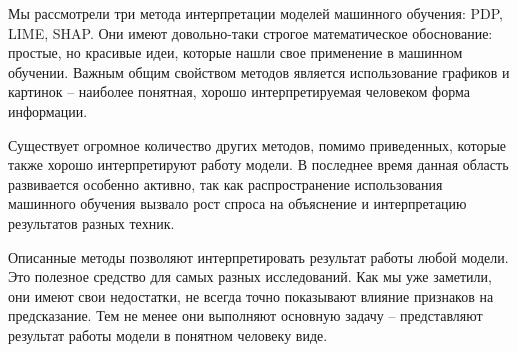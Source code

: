 Мы рассмотрели три метода интерпретации моделей машинного обучения: PDP, LIME, SHAP. Они имеют довольно-таки строгое математическое обоснование: простые, но красивые идеи, которые нашли свое применение в машинном обучении. Важным общим свойством методов является использование графиков и картинок -- наиболее понятная, хорошо интерпретируемая человеком форма информации.

Существует огромное количество других методов, помимо приведенных, которые также хорошо интерпретируют работу модели. В последнее время данная область развивается особенно активно, так как распространение использования машинного обучения вызвало рост спроса на объяснение и интерпретацию результатов разных техник. 

Описанные методы позволяют интерпретировать результат работы любой модели. Это полезное средство для самых разных исследований. Как мы уже заметили, они имеют свои недостатки, не всегда точно показывают влияние признаков на предсказание. Тем не менее они выполняют основную задачу -- представляют результат работы модели в понятном человеку виде.